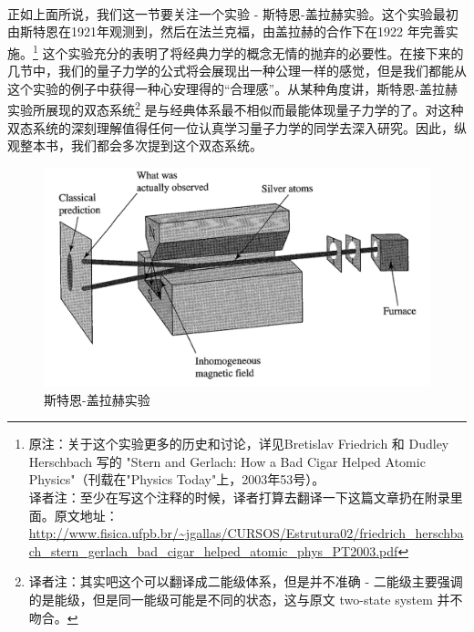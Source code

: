 \documentclass[UTF8,twoside]{ctexart}
\begin{document}
\noindent \\

\noindent {}  \\

\

\noindent 正如上面所说，我们这一节要关注一个实验 - 斯特恩-盖拉赫实验。这个实验最初由斯特恩在1921年观测到，然后在法兰克福，由盖拉赫的合作下在1922 年完善实施。\footnote{原注：关于这个实验更多的历史和讨论，详见Bretislav Friedrich 和 Dudley Herschbach 写的 "Stern and Gerlach: How a Bad Cigar Helped Atomic Physics"（刊载在"Physics Today"上，2003年53号）。\\ 译者注：至少在写这个注释的时候，译者打算去翻译一下这篇文章扔在附录里面。原文地址：
\url{http://www.fisica.ufpb.br/~jgallas/CURSOS/Estrutura02/friedrich_herschbach_stern_gerlach_bad_cigar_helped_atomic_phys_PT2003.pdf}}
这个实验充分的表明了将经典力学的概念无情的抛弃的必要性。在接下来的几节中，我们的量子力学的公式将会展现出一种公理一样的感觉，但是我们都能从这个实验的例子中获得一种心安理得的“合理感”。从某种角度讲，斯特恩-盖拉赫实验所展现的双态系统\footnote{译者注：其实吧这个可以翻译成二能级体系，但是并不准确 - 二能级主要强调的是能级，但是同一能级可能是不同的状态，这与原文 two-state system 并不吻合。} 是与经典体系最不相似而最能体现量子力学的了。对这种双态系统的深刻理解值得任何一位认真学习量子力学的同学去深入研究。因此，纵观整本书，我们都会多次提到这个双态系统。\\


\begin{figure}
\begin{centering}
\includegraphics[width = 12cm]{./Sakurai/Fig_1.1.png}
\caption{斯特恩-盖拉赫实验}
\label {Fig1.1}
\end{centering}
\end{figure}
\end{document}
